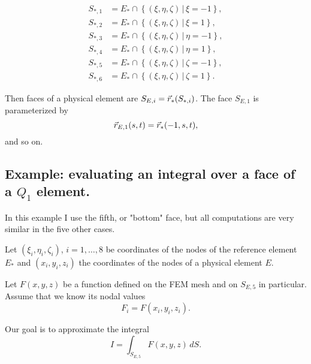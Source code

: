 \documentclass[11pt]{article}
\begin{document}
\begin{equation}
\label{eq:17}
\begin{aligned}
S_{*,1} &=  E_{*} \cap \left \{ (\xi, \eta, \zeta)\, |\, \xi = -1 \right \},\\
S_{*,2} &=  E_{*} \cap \left \{ (\xi, \eta, \zeta)\, |\, \xi = 1  \right \},\\
S_{*,3} &=  E_{*} \cap \left \{ (\xi, \eta, \zeta)\, |\, \eta = -1 \right \},\\
S_{*,4} &=  E_{*} \cap \left \{ (\xi, \eta, \zeta)\, |\, \eta = 1  \right \},\\
S_{*,5} &=  E_{*} \cap \left \{ (\xi, \eta, \zeta)\, |\, \zeta = -1 \right \},\\
S_{*,6} &=  E_{*} \cap \left \{ (\xi, \eta, \zeta)\, |\, \zeta = 1  \right \}.
\end{aligned}
\end{equation}

Then faces of a physical element are $S_{E,i} = \vec r_{*}(S_{*,i})$.
The face $S_{E,1}$ is parameterized by
\begin{equation*}
\label{eq:18}
\vec r_{E,1}(s, t) = \vec r_{*}(-1,s,t),
\end{equation*}
and so on.

\subsection{Example: evaluating an integral over a face of a $Q_{1}$ element.}
\label{sec-4-1}

\newcommand{\face}{S_{E,5}}

In this example I use the fifth, or "bottom" face, but all
computations are very similar in the five other cases.

Let $(\xi_{i}, \eta_{i}, \zeta_{i})$, $i = 1,\dots,8$ be coordinates
of the nodes of the reference element $E_{*}$ and $(x_{i}, y_{i},
z_{i})$ the coordinates of the nodes of a physical element $E$.

Let $F(x,y,z)$ be a function defined on the FEM mesh and on $\face$
in particular. Assume that we know its nodal values
\begin{equation*}
F_{i} = F(x_{i}, y_{i}, z_{i}).
\end{equation*}

Our goal is to approximate the integral
\begin{equation}
\label{eq:19}
I = \int_{\face} F(x,y,z)\, dS.
\end{equation}
\end{document}
